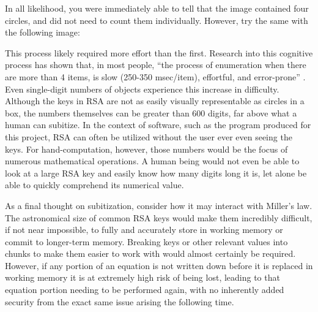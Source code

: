 \documentclass[11pt]{article}
\begin{document}
\begin{itemize}
{\begin{center}
\end{center}

In all likelihood, you were immediately able to tell that the image contained four circles, and did not need to count them individually. However, try the same with the following image:\newline

\begin{center}
\end{center}

This process likely required more effort than the first. Research into this cognitive process has shown that, in most people, ``the process of enumeration when there are more than 4 items, is slow (250-350 msec/item), effortful, and error-prone'' \cite{trick1994}. Even single-digit numbers of objects experience this increase in difficulty. Although the keys in RSA are not as easily visually representable as circles in a box, the numbers themselves can be greater than 600 digits, far above what a human can subitize. In the context of software, such as the program produced for this project, RSA can often be utilized without the user ever even seeing the keys. For hand-computation, however, those numbers would be the focus of numerous mathematical operations. A human being would not even be able to look at a large RSA key and easily know how many digits long it is, let alone be able to quickly comprehend its numerical value.

As a final thought on subitization, consider how it may interact with Miller's law. The astronomical size of common RSA keys would make them incredibly difficult, if not near impossible, to fully and accurately store in working memory or commit to longer-term memory. Breaking keys or other relevant values into chunks to make them easier to work with would almost certainly be required. However, if any portion of an equation is not written down before it is replaced in working memory it is at extremely high risk of being lost, leading to that equation portion needing to be performed again, with no inherently added security from the exact same issue arising the following time.
}
\end{itemize}
\end{document}
